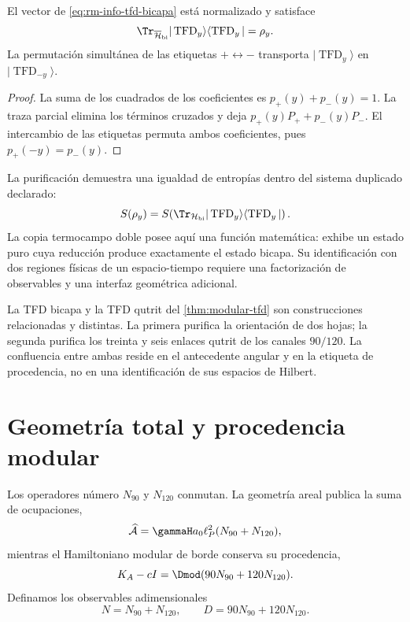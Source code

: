 \begin{proposition}
\label{prop:rm-info-tfd-bicapa}
El vector de \cref{eq:rm-info-tfd-bicapa} est\'a normalizado y satisface
\begin{equation}
 \Tr_{\overline{\mathcal H}_{\rm bi}}
 |\operatorname{TFD}_y\rangle
 \langle\operatorname{TFD}_y|
 =\rho_y.
 \label{eq:rm-info-tfd-partial}
\end{equation}
La permutaci\'on simult\'anea de las etiquetas \(+\leftrightarrow-\)
transporta \(|\operatorname{TFD}_y\rangle\) en
\(|\operatorname{TFD}_{-y}\rangle\).
\end{proposition}

\begin{proof}
La suma de los cuadrados de los coeficientes es
\(p_+(y)+p_-(y)=1\). La traza parcial elimina los t\'erminos cruzados y
deja \(p_+(y)P_++p_-(y)P_-\). El intercambio de las etiquetas permuta
ambos coeficientes, pues \(p_+(-y)=p_-(y)\).
\end{proof}

La purificaci\'on demuestra una igualdad de entrop\'ias dentro del sistema
duplicado declarado:
\begin{equation}
 S(\rho_y)
 =S\!\left(
 \Tr_{\mathcal H_{\rm bi}}
 |\operatorname{TFD}_y\rangle
 \langle\operatorname{TFD}_y|
 \right).
 \label{eq:rm-info-tfd-entropy}
\end{equation}
La copia termocampo doble posee aqu\'i una funci\'on matem\'atica: exhibe un
estado puro cuya reducci\'on produce exactamente el estado bicapa. Su
identificaci\'on con dos regiones f\'isicas de un espacio-tiempo requiere
una factorizaci\'on de observables y una interfaz geom\'etrica adicional.

La TFD bicapa y la TFD qutrit del
\cref{thm:modular-tfd} son construcciones relacionadas y distintas. La
primera purifica la orientaci\'on de dos hojas; la segunda purifica los
treinta y seis enlaces qutrit de los canales \(90/120\). La confluencia
entre ambas reside en el antecedente angular y en la etiqueta de
procedencia, no en una identificaci\'on de sus espacios de Hilbert.

\section{Geometr\'ia total y procedencia modular}

Los operadores n\'umero \(N_{90}\) y \(N_{120}\) conmutan. La geometr\'ia
areal publica la suma de ocupaciones,
\begin{equation}
 \widehat{\mathcal A}
 =\gammaH a_0\ell_P^2(N_{90}+N_{120}),
 \label{eq:rm-info-area-total}
\end{equation}
mientras el Hamiltoniano modular de borde conserva su procedencia,
\begin{equation}
 K_A-cI
 =\Dmod(90N_{90}+120N_{120}).
 \label{eq:rm-info-hhm-provenance}
\end{equation}
Definamos los observables adimensionales
\begin{equation}
 N=N_{90}+N_{120},
 \qquad
 D=90N_{90}+120N_{120}.
 \label{eq:rm-info-ND}
\end{equation}

